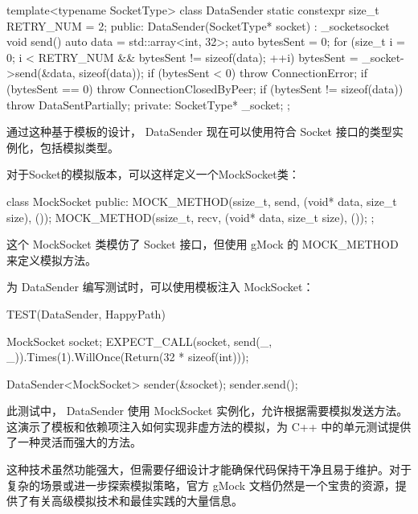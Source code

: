 \begin{cpp}
template<typename SocketType>
class DataSender {
    static constexpr size_t RETRY_NUM = 2;
public:
    DataSender(SocketType* socket) : _socket{socket} {}
    void send() {
        auto data = std::array<int, 32>{};
        auto bytesSent = 0;
        for (size_t i = 0; i < RETRY_NUM && bytesSent != sizeof(data); ++i) {
            bytesSent = _socket->send(&data, sizeof(data));
            if (bytesSent < 0) {
                throw ConnectionError{};
            }
            if (bytesSent == 0) {
                throw ConnectionClosedByPeer{};
            }
        }
        if (bytesSent != sizeof(data)) {
            throw DataSentPartially{};
        }
    }
private:
    SocketType* _socket;
};
\end{cpp}

通过这种基于模板的设计， DataSender 现在可以使用符合 Socket 接口的类型实例化，包括模拟类型。


对于Socket的模拟版本，可以这样定义一个MockSocket类：

\begin{cpp}
class MockSocket {
    public:
    MOCK_METHOD(ssize_t, send, (void* data, size_t size), ());
    MOCK_METHOD(ssize_t, recv, (void* data, size_t size), ());
};
\end{cpp}

这个 MockSocket 类模仿了 Socket 接口，但使用 gMock 的 MOCK\_METHOD 来定义模拟方法。


为 DataSender 编写测试时，可以使用模板注入 MockSocket：

\begin{cpp}
TEST(DataSender, HappyPath) {
    MockSocket socket;
    EXPECT_CALL(socket, send(_, _)).Times(1).WillOnce(Return(32 * sizeof(int)));

    DataSender<MockSocket> sender(&socket);
    sender.send();
}
\end{cpp}

此测试中， DataSender 使用 MockSocket 实例化，允许根据需要模拟发送方法。这演示了模板和依赖项注入如何实现非虚方法的模拟，为 C++ 中的单元测试提供了一种灵活而强大的方法。

这种技术虽然功能强大，但需要仔细设计才能确保代码保持干净且易于维护。对于复杂的场景或进一步探索模拟策略，官方 gMock 文档仍然是一个宝贵的资源，提供了有关高级模拟技术和最佳实践的大量信息。

